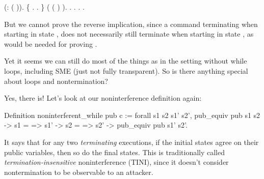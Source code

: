 \documentclass[12pt]{report}
\begin{document}
\begin{coqdoccode}
\coqdocindent{2.00em}
(:   (   )).\coqdoceol
\coqdocindent{2.00em}
\{  .  . \}\coqdoceol
\coqdocindent{2.00em}
 (  (   )     ).\coqdoceol
\coqdocindent{2.00em}
   .  .  .\coqdoceol
\coqdocnoindent
{}.\coqdoceol
\coqdocemptyline
\end{coqdoccode}
But we cannot prove the reverse implication, since a command
    terminating when starting in state , does not necessarily still
    terminate when starting in state    , as
    would be needed for proving . 

 Yet it seems we can still do most of the things as in the setting
    without while loops, including SME (just not fully transparent).
    So is there anything special about loops and nontermination?


    Yes, there is! Let's look at our noninterference definition again:


Definition noninterferent\_while pub c := forall s1 s2 s1' s2',
  pub\_equiv pub s1 s2 ->
  s1 =  => s1' ->
  s2 =  => s2' ->
  pub\_equiv pub s1' s2'.


    It says that for any two \textit{terminating} executions, if the initial states
    agree on their public variables, then so do the final states. This is
    traditionally called \textit{termination-insensitive} noninterference (TINI),
    since it doesn't consider nontermination to be observable to an attacker. 
\end{document}
